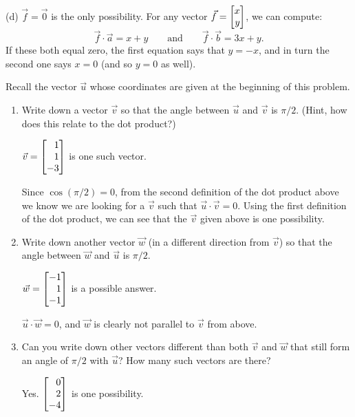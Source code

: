 \documentclass{workbook}
\begin{document}
\begin{slide}
\begin{parts}
\begin{enumerate}
\begin{solution}
					(d) $\vec f = \vec 0$ is the only possibility. For any vector
					$\vec f = \mat{x\\y}$, we can compute:
					\[
						\vec f\cdot \vec a = x + y
						\qquad \text{and} \qquad
						\vec f\cdot \vec b = 3x + y.
					\]
					If these both equal zero, the first equation says that $y = -x$,
					and in turn the second one says $x = 0$ (and so $y = 0$ as well).
				\end{solution}
		\end{enumerate}
	\begin{bookonly}\singlegrid\end{bookonly}

		\item Recall the vector $\vec u$ whose coordinates are given at the beginning of this problem.
		\begin{enumerate}
			\item Write down a vector $\vec v$ so that the angle between $\vec u$
				and $\vec v$ is $\pi/2$. (Hint, how does this relate to the dot
				product?)
				\begin{solution}
					$\vec v = \mat{1\\1\\-3}$ is one such vector.

					Since $\cos(\pi/2) = 0$, from the second definition of the dot
					product above we know we are looking for a $\vec v$ such that
					$\vec u \cdot \vec v = 0$. Using the first definition of the
					dot product, we can see that the $\vec v$ given above is one
					possibility.
				\end{solution}
			\item Write down another vector $\vec w$ (in a different direction from
				$\vec v$) so that the angle between $\vec w$ and $\vec u$ is $\pi/2$.
				\begin{solution}
					$\vec w = \mat{-1\\1\\-1}$ is a possible answer.

					$\vec u \cdot \vec w = 0$, and $\vec w$ is clearly not parallel
					to $\vec v$ from above.
				\end{solution}
			\item Can you write down other vectors different than both $\vec v$
				and $\vec w$ that still	form an angle of $\pi/2$ with $\vec u$?
				How many such vectors are there?
				\begin{solution}
					Yes. $\mat{0\\2\\-4}$ is one possibility.


\end{solution}
\end{enumerate}
\end{parts}
\end{slide}
\end{document}
